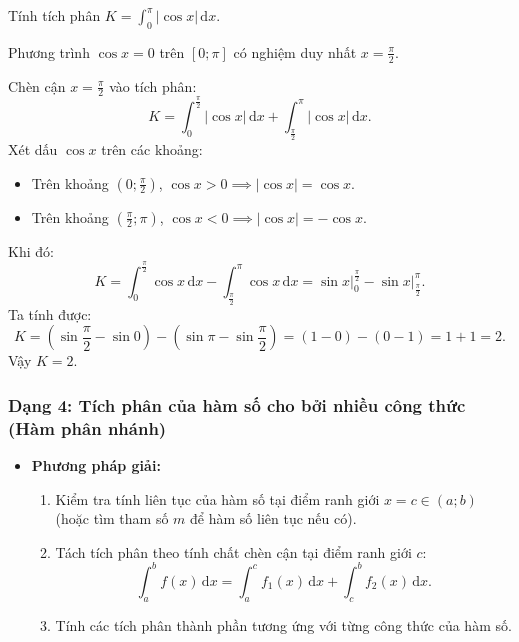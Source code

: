 \documentclass[12pt]{article}
\begin{document}
	\begin{vidu}
		Tính tích phân $K = \displaystyle \int_{0}^{\pi} |\cos x|\,\mathrm{d}x$.
	\end{vidu}
	\begin{loigiai}
		Phương trình $\cos x = 0$ trên $[0; \pi]$ có nghiệm duy nhất $x = \frac{\pi}{2}$.
		
		Chèn cận $x = \frac{\pi}{2}$ vào tích phân:
		\[
		K = \int_{0}^{\frac{\pi}{2}} |\cos x|\,\mathrm{d}x + \int_{\frac{\pi}{2}}^{\pi} |\cos x|\,\mathrm{d}x.
		\]
		Xét dấu $\cos x$ trên các khoảng:
		\begin{itemize}
			\item Trên khoảng $\left(0; \frac{\pi}{2}\right)$, $\cos x > 0 \implies |\cos x| = \cos x$.
			\item Trên khoảng $\left(\frac{\pi}{2}; \pi\right)$, $\cos x < 0 \implies |\cos x| = -\cos x$.
		\end{itemize}
		Khi đó:
		\[
		K = \int_{0}^{\frac{\pi}{2}} \cos x\,\mathrm{d}x - \int_{\frac{\pi}{2}}^{\pi} \cos x\,\mathrm{d}x = \sin x \Big|_0^{\frac{\pi}{2}} - \sin x \Big|_{\frac{\pi}{2}}^{\pi}.
		\]
		Ta tính được:
		\[
		K = (\sin \frac{\pi}{2} - \sin 0) - (\sin \pi - \sin \frac{\pi}{2}) = (1 - 0) - (0 - 1) = 1 + 1 = 2.
		\]
		Vậy $K = 2$.
	\end{loigiai}
	
	\subsubsection{Dạng 4: Tích phân của hàm số cho bởi nhiều công thức (Hàm phân nhánh)}
	\begin{itemize}
		\item \textbf{Phương pháp giải:}
		\begin{enumerate}[label=Bước \arabic*:]
			\item Kiểm tra tính liên tục của hàm số tại điểm ranh giới $x = c \in (a; b)$ (hoặc tìm tham số $m$ để hàm số liên tục nếu có).
			\item Tách tích phân theo tính chất chèn cận tại điểm ranh giới $c$:
			\[
			\int_a^b f(x)\,\mathrm{d}x = \int_a^c f_1(x)\,\mathrm{d}x + \int_c^b f_2(x)\,\mathrm{d}x.
			\]
			\item Tính các tích phân thành phần tương ứng với từng công thức của hàm số.
		\end{enumerate}
	\end{itemize}
	
\end{document}
